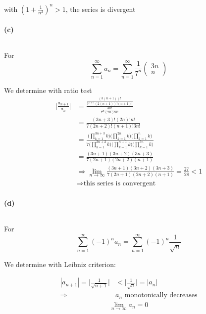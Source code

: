 with $(1+\frac{1}{n^2})^n>1$, the series is divergent

\newpage

\paragraph{(c)}
$ $\newline

For
\begin{equation*}
\sum_{n=1}^{\infty}a_n=\sum_{n=1}^{\infty}\frac{1}{7^n}
\begin{pmatrix}
3n \\
n
\end{pmatrix}
\end{equation*}

We determine with ratio test
\begin{align*}
\Bigg|\frac{a_{n+1}}{a_n}\Bigg|
&=\frac{\frac{(3(n+1))!}{7^{n+1}(2(n+1))!(n+1)!}}{\frac{3n!}{7^n(2n)!n!}}\\
&=\frac{(3n+3)!(2n)!n!}{7(2n+2)!(n+1)!3n!}\\
&=\frac{\Big(\prod_{k=1}^{3n+3}k\Big)\Big(\prod_{k=1}^{2n}k\Big)\Big(\prod_{k=1}^{n}k\Big)}{7\Big(\prod_{k=1}^{2n+2}k\Big)\Big(\prod_{k=1}^{n+1}k\Big)\Big(\prod_{k=1}^{3n}k\Big)}\\
&=\frac{(3n+1)(3n+2)(3n+3)}{7(2n+1)(2n+2)(n+1)}\\
&\Rightarrow\lim_{n\rightarrow\infty}\frac{(3n+1)(3n+2)(3n+3)}{7(2n+1)(2n+2)(n+1)}=\frac{27}{28}<1\\
&\Rightarrow\mbox{this series is convergent}
\end{align*}

\paragraph{(d)}
$ $\newline

For
\begin{equation*}
\sum_{n=1}^{\infty}(-1)^na_n=\sum_{n=1}^{\infty}(-1)^n\frac{1}{\sqrt{n}}
\end{equation*}

We determine with Leibniz criterion:

\begin{align*}
|a_{n+1}|=\Bigg|\frac{1}{\sqrt{n+1}}\Bigg|&<\Bigg|\frac{1}{\sqrt{n}}\Bigg|=|a_n|\\
\Rightarrow&a_n\mbox{ monotonically decreases}
\end{align*}
\begin{align*}
\lim_{n\rightarrow\infty}a_n=0
\end{align*}

